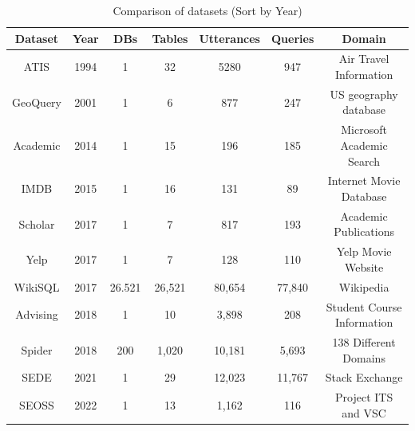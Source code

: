 \begin{table}[!ht]
    \centering
    \begin{tabular}{c|c|c|c|c|c|c}
        \hline
        \textbf{Dataset} & \textbf{Year} & \textbf{DBs} & \textbf{Tables} & \textbf{Utterances} & \textbf{Queries} & \textbf{Domain}            \\ \hline
        ATIS             & 1994          & 1            & 32              & 5280                & 947              & Air Travel Information     \\ \hline
        GeoQuery         & 2001          & 1            & 6               & 877                 & 247              & US geography database      \\ \hline
        Academic         & 2014          & 1            & 15              & 196                 & 185              & Microsoft Academic Search  \\ \hline
        IMDB             & 2015          & 1            & 16              & 131                 & 89               & Internet Movie Database    \\ \hline
        Scholar          & 2017          & 1            & 7               & 817                 & 193              & Academic Publications      \\ \hline
        Yelp             & 2017          & 1            & 7               & 128                 & 110              & Yelp Movie Website         \\ \hline
        WikiSQL          & 2017          & 26.521       & 26,521          & 80,654              & 77,840           & Wikipedia                  \\ \hline
        Advising         & 2018          & 1            & 10              & 3,898               & 208              & Student Course Information \\ \hline
        Spider           & 2018          & 200          & 1,020           & 10,181              & 5,693            & 138 Different Domains      \\ \hline
        SEDE             & 2021          & 1            & 29              & 12,023              & 11,767           & Stack Exchange             \\ \hline
        SEOSS            & 2022          & 1            & 13              & 1,162               & 116              & Project ITS and VSC        \\ \hline
    \end{tabular}
    \caption{Comparison of datasets (Sort by Year)}
    \label{tab:datasets}
\end{table}
